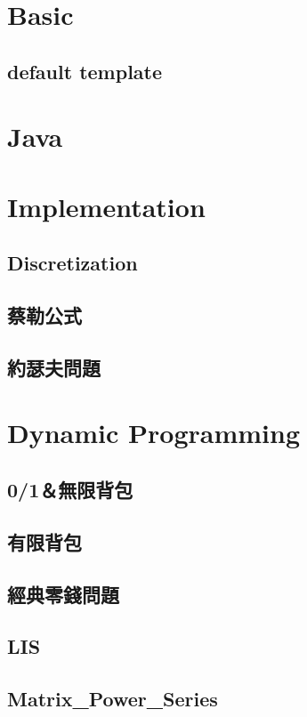 \section{Basic}
	\subsection{default template}
		
\section{Java}
	
\section{Implementation}
	\subsection{Discretization}
		
	\subsection{蔡勒公式}
		
	\subsection{約瑟夫問題}
		
\section{Dynamic Programming}
	\subsection{0/1＆無限背包}
		
	\subsection{有限背包}
		
	\subsection{經典零錢問題}
		
	\subsection{LIS}
		
	\subsection{Matrix\_Power\_Series}
		
